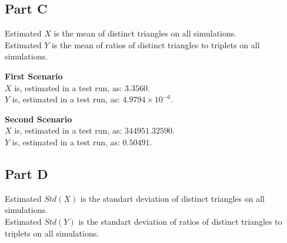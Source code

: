 \documentclass{article}
\begin{document}
        
        \subsection*{Part C}
            \noindent Estimated $X$ is the mean of distinct triangles on all simulations. \\
            Estimated $Y$ is the mean of ratios of distinct triangles to triplets on all simulations.\\

            \begin{minipage}{0.45\textwidth}
                \textbf{First Scenario} \\
                $X$ is, estimated in a test run, as: $3.3560$. \\
                $Y$ is, estimated in a test run, as: $4.9794 \times 10^{-6}$.
            \end{minipage}
            \hfill \vline \hfill
            \begin{minipage}{0.45\textwidth}
                \textbf{Second Scenario} \\
                $X$ is, estimated in a test run, as: $344951.32590$. \\
                $Y$ is, estimated in a test run, as: $0.50491$.
            \end{minipage}

            
        
        \subsection*{Part D}
            \noindent Estimated $Std(X)$ is the standart deviation of distinct triangles on all simulations. \\
            Estimated $Std(Y)$ is the standart deviation of ratios of distinct triangles to triplets on all simulations.\\
            
\end{document}
